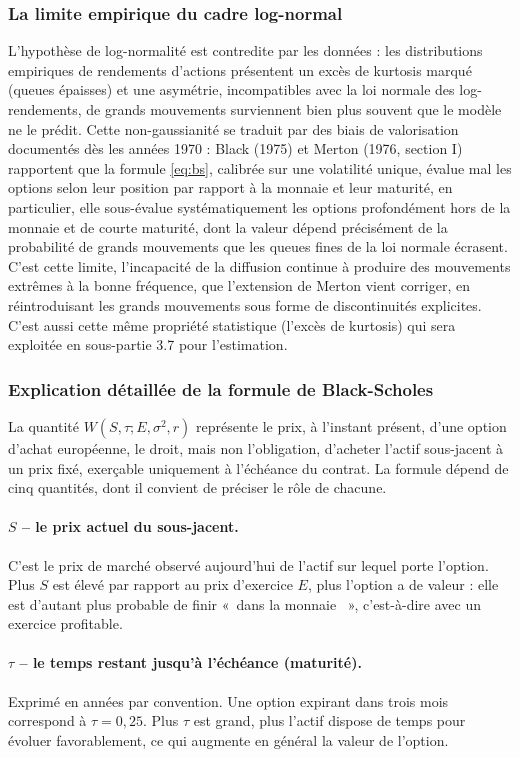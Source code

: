 \documentclass{article}
\providecommand{\og}{«~}
\providecommand{\fg}{~»}
\begin{document}
\subsubsection*{La limite empirique du cadre log-normal}
L'hypothèse de log-normalité est contredite par les données : les distributions empiriques de rendements d'actions présentent un excès de kurtosis marqué (queues épaisses) et une asymétrie, incompatibles avec la loi normale des log-rendements, de grands mouvements surviennent bien plus souvent que le modèle ne le prédit. Cette non-gaussianité se traduit par des biais de valorisation documentés dès les années 1970 : Black (1975) et Merton (1976, section I) rapportent que la formule \eqref{eq:bs}, calibrée sur une volatilité unique, évalue mal les options selon leur position par rapport à la monnaie et leur maturité, en particulier, elle sous-évalue systématiquement les options profondément hors de la monnaie et de courte maturité, dont la valeur dépend précisément de la probabilité de grands mouvements que les queues fines de la loi normale écrasent. C'est cette limite, l'incapacité de la diffusion continue à produire des mouvements extrêmes à la bonne fréquence, que l'extension de Merton vient corriger, en réintroduisant les grands mouvements sous forme de discontinuités explicites. C'est aussi cette même propriété statistique (l'excès de kurtosis) qui sera exploitée en sous-partie 3.7 pour l'estimation.
\subsubsection*{Explication détaillée de la formule de Black-Scholes}
La quantité $W(S,\tau;E,\sigma^2,r)$ représente le prix, à l'instant présent, d'une option d'achat européenne, le droit, mais non l'obligation, d'acheter l'actif sous-jacent à un prix fixé, exerçable uniquement à l'échéance du contrat. La formule dépend de cinq quantités, dont il convient de préciser le rôle de chacune.
\paragraph{$S$ -- le prix actuel du sous-jacent.} C'est le prix de marché observé aujourd'hui de l'actif sur lequel porte l'option. Plus $S$ est élevé par rapport au prix d'exercice $E$, plus l'option a de valeur : elle est d'autant plus probable de finir \og dans la monnaie \fg, c'est-à-dire avec un exercice profitable.
\paragraph{$\tau$ -- le temps restant jusqu'à l'échéance (maturité).} Exprimé en années par convention. Une option expirant dans trois mois correspond à $\tau=0{,}25$. Plus $\tau$ est grand, plus l'actif dispose de temps pour évoluer favorablement, ce qui augmente en général la valeur de l'option.
\end{document}
